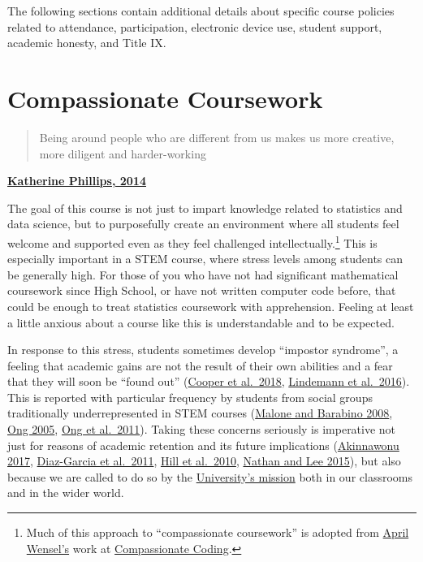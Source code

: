 \documentclass[]{book}
\let\rmarkdownfootnote\footnote%
\def\footnote{\protect\rmarkdownfootnote}
\theoremstyle{definition}
\theoremstyle{definition}
\theoremstyle{definition}
\theoremstyle{remark}
\begin{document}
The following sections contain additional details about specific course
policies related to attendance, participation, electronic device use,
student support, academic honesty, and Title IX.

\hypertarget{compassionate-coursework}{%
\section{Compassionate Coursework}\label{compassionate-coursework}}

\begin{quote}
Being around people who are different from us makes us more creative,
more diligent and harder-working
\end{quote}

\textbf{\href{https://www.scientificamerican.com/article/how-diversity-makes-us-smarter/}{Katherine
Phillips, 2014}}

 The goal of this course is not just to impart knowledge related to
statistics and data science, but to purposefully create an environment
where all students feel welcome and supported even as they feel
challenged intellectually.\footnote{Much of this approach to
  ``compassionate coursework'' is adopted from
  \href{https://twitter.com/aprilwensel}{April Wensel's} work at
  \href{https://compassionatecoding.com}{Compassionate Coding}.} This is
especially important in a STEM course, where stress levels among
students can be generally high. For those of you who have not had
significant mathematical coursework since High School, or have not
written computer code before, that could be enough to treat statistics
coursework with apprehension. Feeling at least a little anxious about a
course like this is understandable and to be expected.

In response to this stress, students sometimes develop ``impostor
syndrome'', a feeling that academic gains are not the result of their
own abilities and a fear that they will soon be ``found out''
(\href{https://www.physiology.org/doi/10.1152/advan.00085.2017}{Cooper
et al.~2018},
\href{http://genderandset.open.ac.uk/index.php/genderandset/article/view/435}{Lindemann
et al.~2016}). This is reported with particular frequency by students
from social groups traditionally underrepresented in STEM courses
(\href{https://onlinelibrary.wiley.com/doi/pdf/10.1002/sce.20307}{Malone
and Barabino 2008}, \href{https://doi.org/10.1525/sp.2005.52.4.593}{Ong
2005}, \href{https://doi.org/10.17763/haer.81.2.t022245n7x4752v2}{Ong et
al.~2011}). Taking these concerns seriously is imperative not just for
reasons of academic retention and its future implications
(\href{https://open.nytimes.com/why-having-a-diverse-team-will-make-your-products-better-c73e7518f677}{Akinnawonu
2017},
\href{https://www.tandfonline.com/doi/abs/10.5172/impp.2013.15.2.149}{Diaz-Garcia
et al.~2011},
\href{https://www.aauw.org/aauw_check/pdf_download/show_pdf.php?file=why-so-few-research}{Hill
et al.~2010},
\href{https://www.tandfonline.com/doi/abs/10.1111/ecge.12016}{Nathan and
Lee 2015}), but also because we are called to do so by the
\href{https://www.slu.edu/about/catholic-jesuit-identity/mission.php}{University's
mission} both in our classrooms and in the wider world.
\end{document}
